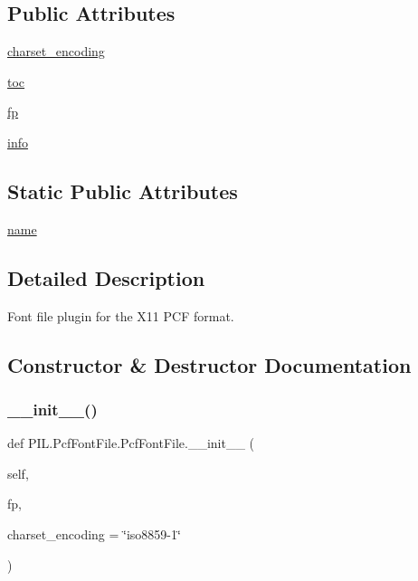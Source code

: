 \subsection*{Public Attributes}
\begin{DoxyCompactItemize}
\item 
\hyperlink{classPIL_1_1PcfFontFile_1_1PcfFontFile_a51b63a7d5912f67b31188865b1e0c3ad}{charset\+\_\+encoding}
\item 
\hyperlink{classPIL_1_1PcfFontFile_1_1PcfFontFile_a158c4819650cd6f1e6f6c0cdd5fd6646}{toc}
\item 
\hyperlink{classPIL_1_1PcfFontFile_1_1PcfFontFile_a9b4b5dfc5e8337da6a837fc88e8b9d50}{fp}
\item 
\hyperlink{classPIL_1_1PcfFontFile_1_1PcfFontFile_ae7e82862c1e8a4efec01c8df4bc2998e}{info}
\end{DoxyCompactItemize}
\subsection*{Static Public Attributes}
\begin{DoxyCompactItemize}
\item 
\hyperlink{classPIL_1_1PcfFontFile_1_1PcfFontFile_a43952bdafe3bdf0aae191129149c5f4f}{name}
\end{DoxyCompactItemize}


\subsection{Detailed Description}
\begin{DoxyVerb}Font file plugin for the X11 PCF format.\end{DoxyVerb}
 

\subsection{Constructor \& Destructor Documentation}
\mbox{\label{classPIL_1_1PcfFontFile_1_1PcfFontFile_a7db83e0bfc91ca3aec31b38bda8a1daf}} 
\subsubsection{\texorpdfstring{\+\_\+\+\_\+init\+\_\+\+\_\+()}{\_\_init\_\_()}}
{\footnotesize\ttfamily def P\+I\+L.\+Pcf\+Font\+File.\+Pcf\+Font\+File.\+\_\+\+\_\+init\+\_\+\+\_\+ (\begin{DoxyParamCaption}\item[{}]{self,  }\item[{}]{fp,  }\item[{}]{charset\+\_\+encoding = {\ttfamily \char`\"{}iso8859-\/1\char`\"{}} }\end{DoxyParamCaption})}



